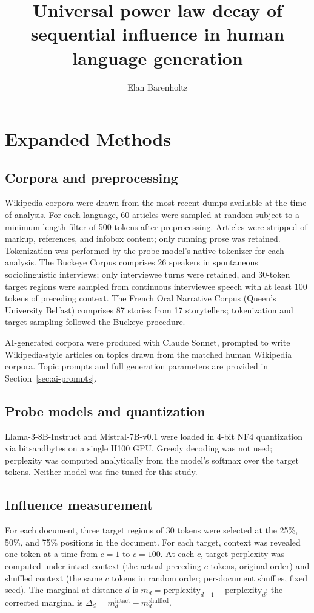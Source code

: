 \documentclass[9pt,twoside,lineno]{pnas-new}
\title{Universal power law decay of sequential influence in human language generation}
\author{Elan Barenholtz}
\begin{document}
\maketitle


\section*{Expanded Methods}

\subsection*{Corpora and preprocessing}
Wikipedia corpora were drawn from the most recent dumps available at the time of analysis. For each language, 60 articles were sampled at random subject to a minimum-length filter of 500 tokens after preprocessing. Articles were stripped of markup, references, and infobox content; only running prose was retained. Tokenization was performed by the probe model's native tokenizer for each analysis. The Buckeye Corpus comprises 26 speakers in spontaneous sociolinguistic interviews; only interviewee turns were retained, and 30-token target regions were sampled from continuous interviewee speech with at least 100 tokens of preceding context. The French Oral Narrative Corpus (Queen's University Belfast) comprises 87 stories from 17 storytellers; tokenization and target sampling followed the Buckeye procedure.

AI-generated corpora were produced with Claude Sonnet, prompted to write Wikipedia-style articles on topics drawn from the matched human Wikipedia corpora. Topic prompts and full generation parameters are provided in Section~\ref{sec:ai-prompts}.

\subsection*{Probe models and quantization}
Llama-3-8B-Instruct and Mistral-7B-v0.1 were loaded in 4-bit NF4 quantization via bitsandbytes on a single H100 GPU. Greedy decoding was not used; perplexity was computed analytically from the model's softmax over the target tokens. Neither model was fine-tuned for this study.

\subsection*{Influence measurement}
For each document, three target regions of 30 tokens were selected at the 25\%, 50\%, and 75\% positions in the document. For each target, context was revealed one token at a time from $c = 1$ to $c = 100$. At each $c$, target perplexity was computed under intact context (the actual preceding $c$ tokens, original order) and shuffled context (the same $c$ tokens in random order; per-document shuffles, fixed seed). The marginal at distance $d$ is $m_d = \text{perplexity}_{d-1} - \text{perplexity}_d$; the corrected marginal is $\Delta_d = m^{\text{intact}}_d - m^{\text{shuffled}}_d$.
\end{document}
